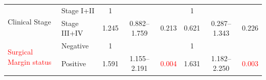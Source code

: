\documentclass[12pt, a4paper]{article}
\begin{document}
\begin{table}[hp]
{\begin{tabular}{|l|l|c|c|c|c|c|c|}
\hline
\multirow{2}{*}{Clinical Stage}         & {\cellcolor[rgb]{0.62,0.812,0.878}}Stage I+II                                       & {\cellcolor[rgb]{0.62,0.812,0.878}}1                                           & {\cellcolor[rgb]{0.62,0.812,0.878}}                                           & {\cellcolor[rgb]{0.62,0.812,0.878}}                                           & {\cellcolor[rgb]{0.62,0.812,0.878}}1                                           & {\cellcolor[rgb]{0.62,0.812,0.878}}                                           & {\cellcolor[rgb]{0.62,0.812,0.878}}                                            \\ 
\cline{2-8}
                                        & Stage III+IV                                                                        & 1.245                                                                          & 0.882--1.759                                                                   & 0.213                                                                         & 0.621                                                                          & 0.287--1.343                                                                   & 0.226                                                                          \\ 
\hline
\multirow{2}{*}{\textcolor{red}{Surgical Margin status}} & {\cellcolor[rgb]{0.62,0.812,0.878}}Negative                                         & {\cellcolor[rgb]{0.62,0.812,0.878}}1                                           & {\cellcolor[rgb]{0.62,0.812,0.878}}                                           & {\cellcolor[rgb]{0.62,0.812,0.878}}                                           & {\cellcolor[rgb]{0.62,0.812,0.878}}1                                           & {\cellcolor[rgb]{0.62,0.812,0.878}}                                           & {\cellcolor[rgb]{0.62,0.812,0.878}}                                            \\ 
\cline{2-8}
                                        & Positive                                                                            & 1.591                                                                          & 1.155--2.191                                                                   & \textcolor{red}{0.004}                                                        & 1.631                                                                          & 1.182--2.250                                                                   & \textcolor{red}{0.003}                                                         \\ 

\end{tabular}}
\end{table}
\end{document}
